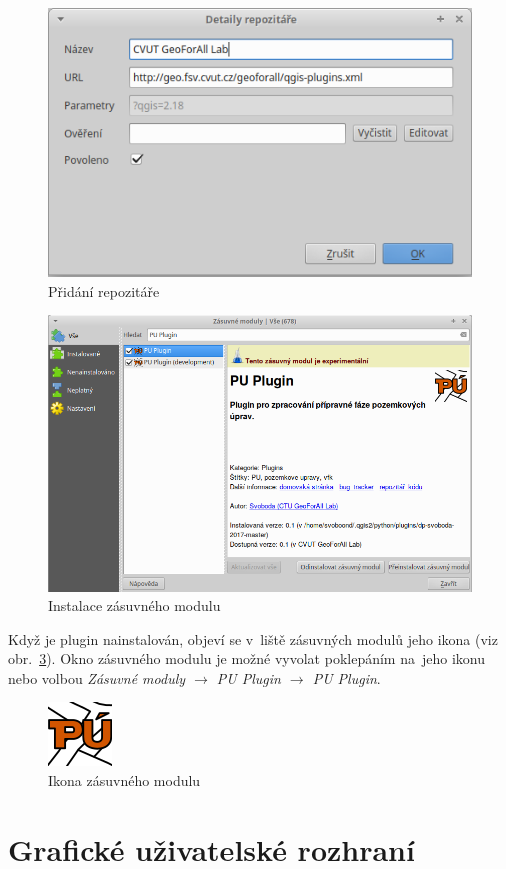 	\begin{figure}[H]
		\centering
		\includegraphics[width=.6\textwidth]{./pictures/pridani_repozitare-geoforall_lab.png}
		\caption[Přidání repozitáře GeoForAll Lab]{Přidání repozitáře}
		\label{fig:pridani_repozitare_geoforall_lab}
 	\end{figure}

	\begin{figure}[H]
		\centering
		\includegraphics[width=.6\textwidth]{./pictures/instalace_puplugin.png}
		\caption[Instalace zásuvného modulu]{Instalace zásuvného modulu}
		\label{fig:instalace_puplugin}
 	\end{figure}

Když je plugin nainstalován, objeví se v~liště zásuvných modulů jeho ikona (viz obr.~\ref{fig:ikona_puplugin}). Okno zásuvného modulu je možné vyvolat poklepáním na~jeho ikonu nebo volbou \textit{Zásuvné moduly $\rightarrow$ PU Plugin $\rightarrow$ PU Plugin}.

	\begin{figure}[H]
		\centering
		\includegraphics[width=.1\textwidth]{./pictures/puplugin.png}
		\caption[Ikona zásuvného modulu]{Ikona zásuvného modulu}
		\label{fig:ikona_puplugin}
 	\end{figure}

\section{Grafické uživatelské rozhraní}
\label{gui}


